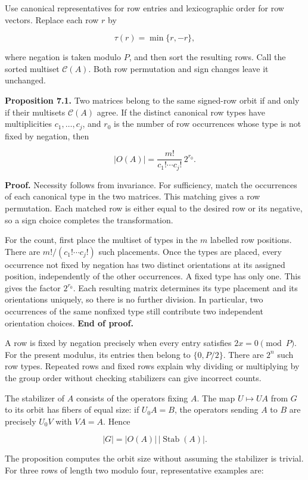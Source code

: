 \documentclass[
]{article}
\begin{document}
Use canonical representatives for row entries and lexicographic order
for row vectors. Replace each row \(r\) by

\[
\tau(r)=\min\{r,-r\},
\]

where negation is taken modulo \(P\), and then sort the resulting rows.
Call the sorted multiset \(\mathcal C(A)\). Both row permutation and
sign changes leave it unchanged.

\textbf{Proposition 7.1.} Two matrices belong to the same signed-row
orbit if and only if their multisets \(\mathcal C(A)\) agree. If the
distinct canonical row types have multiplicities \(c_1,\ldots,c_j\), and
\(r_0\) is the number of row occurrences whose type is not fixed by
negation, then

\[
|O(A)|=\frac{m!}{c_1!\cdots c_j!}\,2^{r_0}.
\]

\textbf{Proof.} Necessity follows from invariance. For sufficiency,
match the occurrences of each canonical type in the two matrices. This
matching gives a row permutation. Each matched row is either equal to
the desired row or its negative, so a sign choice completes the
transformation.

For the count, first place the multiset of types in the \(m\) labelled
row positions. There are \(m!/(c_1!\cdots c_j!)\) such placements. Once
the types are placed, every occurrence not fixed by negation has two
distinct orientations at its assigned position, independently of the
other occurrences. A fixed type has only one. This gives the factor
\(2^{r_0}\). Each resulting matrix determines its type placement and its
orientations uniquely, so there is no further division. In particular,
two occurrences of the same nonfixed type still contribute two
independent orientation choices. \textbf{End of proof.}

A row is fixed by negation precisely when every entry satisfies
\(2x=0\pmod P\). For the present modulus, its entries then belong to
\(\{0,P/2\}\). There are \(2^n\) such row types. Repeated rows and fixed
rows explain why dividing or multiplying by the group order without
checking stabilizers can give incorrect counts.

The stabilizer of \(A\) consists of the operators fixing \(A\). The map
\(U\mapsto UA\) from \(G\) to its orbit has fibers of equal size: if
\(U_0A=B\), the operators sending \(A\) to \(B\) are precisely \(U_0V\)
with \(VA=A\). Hence

\[
|G|=|O(A)|\,|\operatorname{Stab}(A)|.
\]

The proposition computes the orbit size without assuming the stabilizer
is trivial. For three rows of length two modulo four, representative
examples are:
\end{document}
